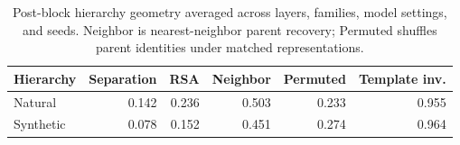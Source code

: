 \begin{table}[H]\centering\small
\begin{tabular}{lrrrrr}\toprule
Hierarchy & Separation & RSA & Neighbor & Permuted & Template inv. \\\midrule
Natural & 0.142 & 0.236 & 0.503 & 0.233 & 0.955 \\
Synthetic & 0.078 & 0.152 & 0.451 & 0.274 & 0.964 \\
\bottomrule\end{tabular}
\caption{Post-block hierarchy geometry averaged across layers, families, model settings, and seeds. Neighbor is nearest-neighbor parent recovery; Permuted shuffles parent identities under matched representations.}
\label{tab:paper06-main}
\end{table}
